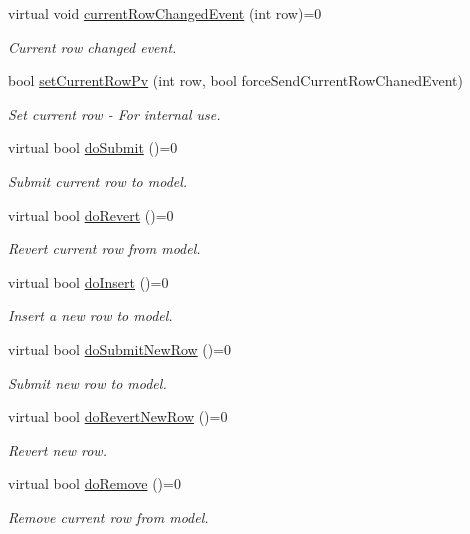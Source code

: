 \begin{DoxyCompactItemize}
virtual void \hyperlink{classmdt_abstract_sql_table_controller_a54f26adac8f6323938f74598055da2a9}{current\-Row\-Changed\-Event} (int row)=0
\begin{DoxyCompactList}\small\item\em Current row changed event. \end{DoxyCompactList}\item 
bool \hyperlink{classmdt_abstract_sql_table_controller_a12c35f97b31198ec484a199cb59525da}{set\-Current\-Row\-Pv} (int row, bool force\-Send\-Current\-Row\-Chaned\-Event)
\begin{DoxyCompactList}\small\item\em Set current row -\/ For internal use. \end{DoxyCompactList}\item 
virtual bool \hyperlink{classmdt_abstract_sql_table_controller_adb5018003704bf46456e6a4f197c3d3a}{do\-Submit} ()=0
\begin{DoxyCompactList}\small\item\em Submit current row to model. \end{DoxyCompactList}\item 
virtual bool \hyperlink{classmdt_abstract_sql_table_controller_a7c7eba056561498b7615cbcda6a40695}{do\-Revert} ()=0
\begin{DoxyCompactList}\small\item\em Revert current row from model. \end{DoxyCompactList}\item 
virtual bool \hyperlink{classmdt_abstract_sql_table_controller_ad42a302959d6c72e3e3b9af419fb1b78}{do\-Insert} ()=0
\begin{DoxyCompactList}\small\item\em Insert a new row to model. \end{DoxyCompactList}\item 
virtual bool \hyperlink{classmdt_abstract_sql_table_controller_aeb31c53590c86f93c7285050dda4891d}{do\-Submit\-New\-Row} ()=0
\begin{DoxyCompactList}\small\item\em Submit new row to model. \end{DoxyCompactList}\item 
virtual bool \hyperlink{classmdt_abstract_sql_table_controller_a786547dd3752911fca6629058e299492}{do\-Revert\-New\-Row} ()=0
\begin{DoxyCompactList}\small\item\em Revert new row. \end{DoxyCompactList}\item 
virtual bool \hyperlink{classmdt_abstract_sql_table_controller_a4e44b446a5d24486cfcaea65692a4670}{do\-Remove} ()=0
\begin{DoxyCompactList}\small\item\em Remove current row from model. \end{DoxyCompactList}\end{DoxyCompactItemize}
